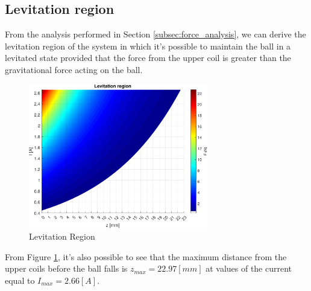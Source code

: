 \subsection{Levitation region}
\label{subsec:levitation_region}

From the analysis performed in Section \ref{subsec:force_analysis}, we can derive the levitation region of the system in which it's possible to maintain the ball in a levitated state provided that the force from the upper coil is greater than the gravitational force acting on the ball.

\begin{figure}[H]
    \centering
    \includegraphics[width=0.7\textwidth]{./img/MATLAB/analysis/levitation_region.pdf}
    \caption{Levitation Region}
    \label{fig:levitation_region}
\end{figure}

From Figure \ref{fig:levitation_region}, it's also possible to see that the maximum distance from the upper coils before the ball falls is $z_{max} = 22.97 [mm]$ at values of the current equal to $I_{max} = 2.66 [A]$.